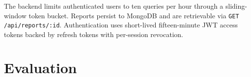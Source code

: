 \documentclass[conference]{IEEEtran}
\begin{document}

The backend limits authenticated users to ten queries per hour through a sliding-window token bucket. Reports persist to MongoDB and are retrievable via \texttt{GET /api/reports/:id}. Authentication uses short-lived fifteen-minute JWT access tokens backed by refresh tokens with per-session revocation.

\section{Evaluation}
\label{sec:evaluation}
\end{document}
